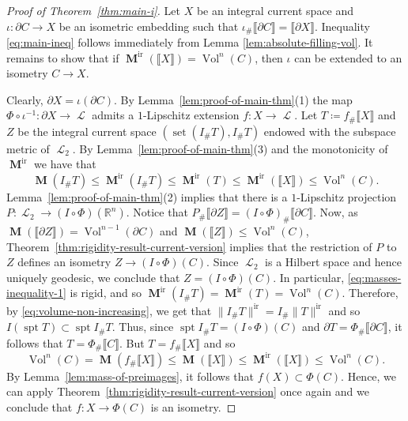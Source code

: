 \documentclass[reqno]{amsart}
\numberwithin{equation}{section}
\newcommand{\R}{\mathbb{R}}
\newcommand{\spt}{\operatorname{spt}}
\newcommand{\vol}{\operatorname{Vol}}
\newcommand{\norm}[1]{\lVert#1\rVert}
\newcommand{\bb}[1]{\llbracket #1\rrbracket}
\newcommand{\susbet}{\subset}
\DeclareMathOperator{\mass}{\mathbf{M}}
\DeclareMathOperator{\set}{set}
\DeclareMathOperator{\Ell}{\mathscr{L}}
\DeclareMathOperator{\ir}{ir}
\begin{document}
\begin{proof}[Proof of Theorem~\ref{thm:main-i}]
Let \(X\) be an integral current space and \(\iota\colon \partial C \to X\) be an isometric embedding such that \(\iota_\# \bb{\partial C}=\bb{\partial X}\). Inequality \eqref{eq:main-ineq} follows immediately from Lemma \ref{lem:absolute-filling-vol}. It remains to show that if \(\mass^{\ir}(\bb{X})=\vol^n(C)\), then \(\iota\) can be extended to an isometry \(C \to X\).

Clearly, \(\partial X= \iota(\partial C)\). By Lemma~\ref{lem:proof-of-main-thm}(1) the map \(\Phi\circ \iota^{-1}\colon \partial X \to \Ell\) admits a \(1\)-Lipschitz extension \(f\colon X \to \Ell\). Let \(T\coloneqq f_\# \bb{X}\) and $Z$ be the integral current space $(\set(I_\# T), I_\# T)$ endowed with the subspace metric of \(\Ell_2\). By Lemma~\ref{lem:proof-of-main-thm}(3) and the monotonicity of $\mass^{\ir}$ we have that
\begin{equation}\label{eq:masses-inequality-1}
\mass(I_\# T)\leq \mass^{\ir}(I_\# T)\leq \mass^{\ir}(T)\leq  \mass^{\ir}(\bb{X})\leq \vol^n(C).
\end{equation}
Lemma~\ref{lem:proof-of-main-thm}(2) implies that there is a $1$-Lipschitz projection $P\colon \Ell_2\to (I\circ \Phi)(\R^n)$. Notice that \(P_\# \bb{\partial Z}=(I\circ \Phi)_{\#} \bb{\partial C}\). Now, as \(\mass(\bb{\partial Z})=\vol^{n-1}(\partial C)\) and \(\mass(\bb{Z})\leq \vol^n(C)\), Theorem~\ref{thm:rigidity-result-current-version} implies that the restriction of $P$ to $Z$ defines an isometry $Z\to (I\circ \Phi)(C)$. Since $\Ell_2$ is a Hilbert space and hence uniquely geodesic, we conclude that $Z=(I\circ \Phi)(C)$.  In particular, \eqref{eq:masses-inequality-1} is rigid, and so \(\mass^{\ir}(I_\# T)=\mass^{\ir}(T)=\vol^n(C)\). Therefore, by \eqref{eq:volume-non-increasing}, we get that \(\norm{I_\# T}^{\ir}=I_\# \norm{T}^{\ir}\) and so \(I(\spt T)\subset \spt I_\# T\). Thus, since \(\spt I_\# T=(I\circ \Phi)(C)\) and \(\partial T=\Phi_\# \bb{\partial C}\), it follows that \(T=\Phi_\# \bb{C}\). But \(T=f_\# \bb{X}\) and so
\[
\vol^n(C)=\mass(f_\# \bb{X})\leq \mass(\bb{X}) \leq \mass^{\ir}(\bb{X})\leq \vol^n(C).
\]
By Lemma~\ref{lem:mass-of-preimages}, it follows that \(f(X)\susbet \Phi(C)\). Hence, we can apply Theorem~\ref{thm:rigidity-result-current-version} once again and we conclude that $f\colon X\to \Phi(C)$ is an isometry.
\end{proof}

\end{document}
